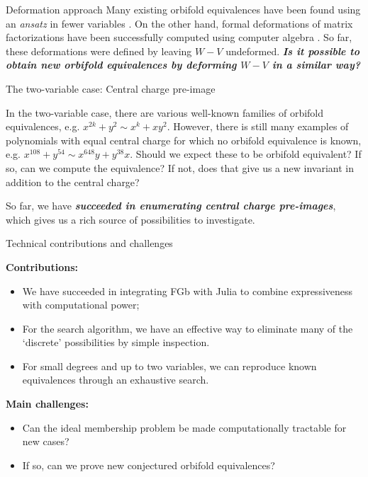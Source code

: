 \documentclass[final]{beamer}
\newlength{\onecolwid}
\begin{document}
\begin{frame}[t]
\begin{columns}[t]
\begin{column}{\onecolwid}
\begin{block}{Deformation approach}
Many existing orbifold equivalences have been found using an \emph{ansatz}
in fewer variables \cite{camacho2016orbifold} \cite{camacho2016strangely}. On the other
hand, formal deformations of matrix factorizations have been successfully
computed using computer algebra \cite{carqueville2012algorithmic}. So far, these deformations
were defined by leaving $W-V$ undeformed. \textbf{\emph{Is it possible
to obtain new orbifold equivalences by deforming $W-V$ in a similar
way?}}
\end{block}

\begin{block}{The two-variable case: Central charge pre-image}

In the two-variable case, there are various well-known families of
orbifold equivalences, e.g. $x^{2k}+y^{2}\sim x^{k}+xy^{2}$. However,
there is still many examples of polynomials with equal central charge
for which no orbifold equivalence is known, e.g. $x^{108}+y^{54}\sim x^{648}y+y^{38}x$.
Should we expect these to be orbifold equivalent? If so, can we compute
the equivalence? If not, does that give us a new invariant in addition
to the central charge?

So far, we have \textbf{\emph{succeeded in enumerating central charge
pre-images}}, which gives us a rich source of possibilities\textbf{\emph{
}}to investigate.
\end{block}
%
\begin{block}{Technical contributions and challenges}

{\bf Contributions:}
\begin{itemize}
\item We have succeeded in integrating FGb with Julia to combine expressiveness
with computational power;
\item For the search algorithm, we have an effective way to eliminate many
of the `discrete' possibilities by simple inspection.
\item For small degrees and up to two variables, we can reproduce known equivalences
through an exhaustive search.
\end{itemize}
{\bf Main challenges:}
\begin{itemize}
\item Can the ideal membership problem be made computationally tractable for new cases?
\item If so, can we prove new conjectured orbifold equivalences?
\end{itemize}
\end{block}


\end{column}
\end{columns}
\end{frame}
\end{document}
